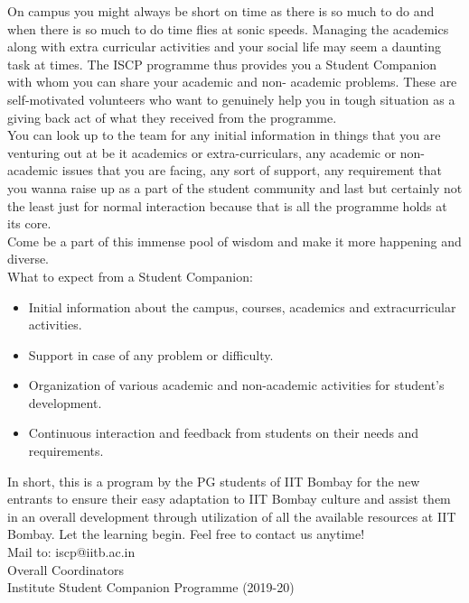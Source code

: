 \documentclass[openany]{book} %
\begin{document}
On campus you might always be short on time as there is so much to do and when there is so much to do time
flies at sonic speeds. Managing the academics along with extra curricular activities and your social life may
seem a daunting task at times. The ISCP programme thus provides you a Student Companion with whom you
can share your academic and non- academic problems. These are self-motivated volunteers who want to
genuinely help you in tough situation as a giving back act of what they received from the programme.\\
You can look up to the team for any initial information in things that you are venturing out at be it academics or
extra-curriculars, any academic or non- academic issues that you are facing, any sort of support, any
requirement that you wanna raise up as a part of the student community and last but certainly not the least just
for normal interaction because that is all the programme holds at its core.\\
Come be a part of this immense pool of wisdom and make it more happening and diverse.\\
What to expect from a Student Companion:
	\begin{itemize}
	    \item Initial information about the campus, courses, academics and extracurricular activities.
	    \item Support in case of any problem or difficulty.
	    \item Organization of various academic and non-academic activities for student’s development.
	    \item Continuous interaction and feedback from students on their needs and requirements.
	\end{itemize}
\newpage
 In short, this is a program by the PG students of IIT Bombay for the new entrants to ensure their easy adaptation to IIT Bombay culture and assist them in an overall development through utilization of all the available resources at IIT Bombay. Let the learning begin. Feel free to contact us anytime!\\
    Mail to: iscp@iitb.ac.in\\
Overall Coordinators\\
Institute Student Companion Programme (2019-20)\\
\end{document}

